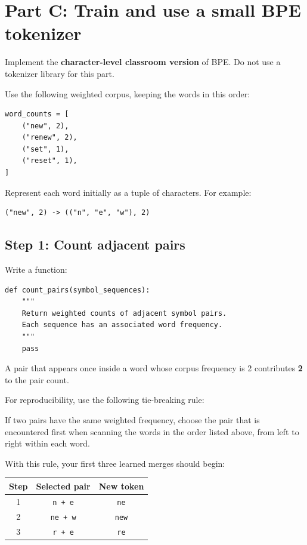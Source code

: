 \documentclass[11pt,a4paper]{article}
\begin{document}
\section{Part C: Train and use a small BPE tokenizer}

Implement the \textbf{character-level classroom version} of BPE. Do not use a tokenizer library for this part.

Use the following weighted corpus, keeping the words in this order:

\begin{lstlisting}
word_counts = [
    ("new", 2),
    ("renew", 2),
    ("set", 1),
    ("reset", 1),
]
\end{lstlisting}

Represent each word initially as a tuple of characters. For example:

\begin{lstlisting}
("new", 2) -> (("n", "e", "w"), 2)
\end{lstlisting}

\subsection{Step 1: Count adjacent pairs}

Write a function:

\begin{lstlisting}
def count_pairs(symbol_sequences):
    """
    Return weighted counts of adjacent symbol pairs.
    Each sequence has an associated word frequency.
    """
    pass
\end{lstlisting}

A pair that appears once inside a word whose corpus frequency is 2 contributes \textbf{2} to the pair count.

For reproducibility, use the following tie-breaking rule:

\begin{noticebox}
If two pairs have the same weighted frequency, choose the pair that is encountered first when scanning the words in the order listed above, from left to right within each word.
\end{noticebox}

With this rule, your first three learned merges should begin:

\begin{center}
\begin{tabular}{c c c}
\toprule
\textbf{Step} & \textbf{Selected pair} & \textbf{New token} \\
\midrule
1 & \texttt{n + e} & \texttt{ne} \\
2 & \texttt{ne + w} & \texttt{new} \\
3 & \texttt{r + e} & \texttt{re} \\
\bottomrule
\end{tabular}
\end{center}
\end{document}

